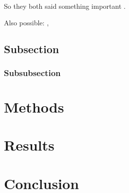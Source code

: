 So they both said something important \cite{dirac,einstein}.

Also possible: \parencite{einstein}, \textcite{dirac}

\subsection{Subsection}
\subsubsection{Subsubsection}



\section{Methods}
\section{Results}
\section{Conclusion}




















\printbibliography












